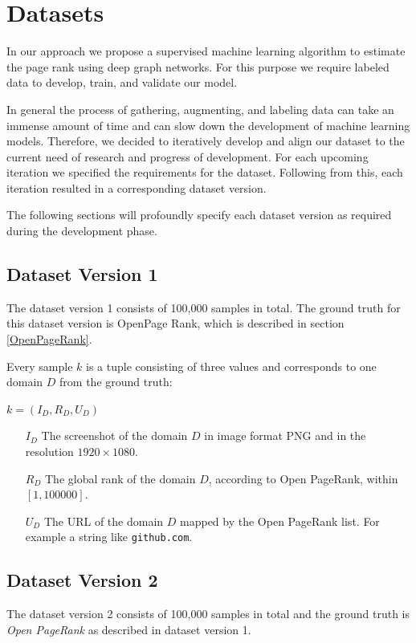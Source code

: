 
\section{Datasets}

In our approach we propose a supervised machine learning algorithm to estimate the page rank using deep graph networks. For this purpose we require labeled data to develop, train, and validate our model.

In general the process of gathering, augmenting, and labeling data can take an immense amount of time and can slow down the development of machine learning models. Therefore, we decided to iteratively develop and align our dataset to the current need of research and progress of development. For each upcoming iteration we specified the requirements for the dataset. Following from this, each iteration resulted in a corresponding dataset version.

The following sections will profoundly specify each dataset version as required during the development phase.

\subsection{Dataset Version 1}
\label{DatasetVersion1}
The dataset version 1 consists of 100,000 samples in total. The ground truth for this dataset version is OpenPage Rank, which is described in section \ref{OpenPageRank}.

Every sample $k$ is a tuple consisting of three values and corresponds to one domain $D$ from the ground truth:

\begin{center}
 $ k = (I_D, R_D, U_D)$
\begin{itemize}
	\item[$I_D$] The screenshot of the domain $D$ in image format PNG and in the resolution $1920\times1080$.
	\item[$R_D$] The global rank of the domain $D$, according to Open PageRank, within $[1, 100000]$. 
	\item[$U_D$] The URL of the domain $D$ mapped by the Open PageRank list. For example a string like \texttt{github.com}.
\end{itemize}
\end{center}

\subsection{Dataset Version 2}
\label{DatasetVersion2}
The dataset version 2 consists of 100,000 samples in total and the ground truth is \textit{Open PageRank} as described in dataset version 1.

